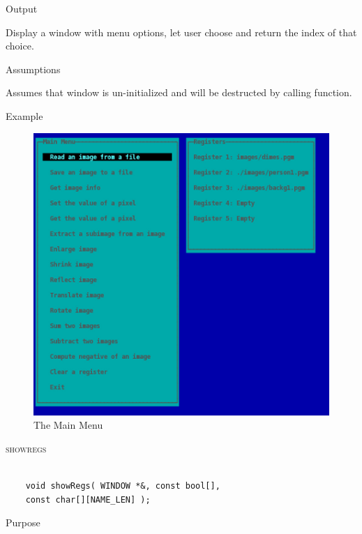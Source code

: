 \documentclass[pdftex, 11pt]{article}
\begin{document}
\begin{description}
\begin{description}
\begin{itemize}
				\end{itemize}

			\item{Output}
				
				Display a window with menu options, let user choose and
				return the index of that choice.

			\item{Assumptions}

				Assumes that window is un-initialized and will be destructed
				by calling function.

			\item{Example}

				\begin{figure}[p]
					\centering
					\caption{The Main Menu}
					\includegraphics{images/menu.png}
				\end{figure}

		\end{description}


	\item{\textsc{showregs}}

		\begin{lstlisting}

	void showRegs( WINDOW *&, const bool[], 
	const char[][NAME_LEN] );	
		\end{lstlisting}

		\begin{description}
			\item{Purpose}


\end{description}
\end{description}
\end{document}
